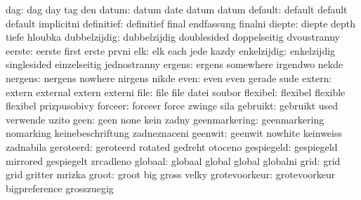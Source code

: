                dag:  dag                  day                 tag
                      den
              datum:  datum                date                datum
                      datum
            default:  default              default             default
                      implicitni
         definitief:  definitief           final               endfassung
                      finalni
             diepte:  diepte               depth               tiefe
                      hloubka
       dubbelzijdig:  dubbelzijdig         doublesided         doppelseitig
                      dvoustranny
             eerste:  eerste               first               erste
                      prvni
                elk:  elk                  each                jede
                      kazdy
        enkelzijdig:  enkelzijdig          singlesided         einzelseitig
                      jednostranny
             ergens:  ergens               somewhere           irgendwo
                      nekde
            nergens:  nergens              nowhere             nirgens
                      nikde
               even:  even                 even                gerade
                      sude
             extern:  extern               external            extern
                      externi
               file:  file                 file                datei
                      soubor
           flexibel:  flexibel             flexible            flexibel
                      prizpusobivy
            forceer:  forceer              force               zwinge
                      sila
           gebruikt:  gebruikt             used                verwende
                      uzito
               geen:  geen                 none                kein
                      zadny
      geenmarkering:  geenmarkering        nomarking           keinebeschriftung
                      zadneznaceni
            geenwit:  geenwit              nowhite             keinweiss
                      zadnabila
          geroteerd:  geroteerd            rotated             gedreht
                      otoceno
         gespiegeld:  gespiegeld           mirrored            gespiegelt
                      zrcadleno
            globaal:  globaal              global              global
                      globalni
               grid:  grid                 grid                gritter
                      mrizka
              groot:  groot                big                 gross
                      velky
      grotevoorkeur:  grotevoorkeur        bigpreference       grosszuegig
